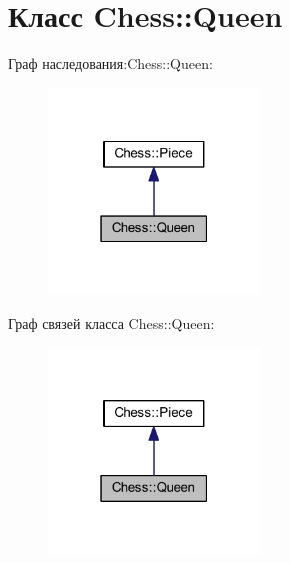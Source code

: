 \hypertarget{class_chess_1_1_queen}{}\section{Класс Chess\+:\+:Queen}
\label{class_chess_1_1_queen}


Граф наследования\+:Chess\+:\+:Queen\+:\nopagebreak
\begin{figure}[H]
\begin{center}
\leavevmode
\includegraphics[width=159pt]{class_chess_1_1_queen__inherit__graph}
\end{center}
\end{figure}


Граф связей класса Chess\+:\+:Queen\+:\nopagebreak
\begin{figure}[H]
\begin{center}
\leavevmode
\includegraphics[width=159pt]{class_chess_1_1_queen__coll__graph}
\end{center}
\end{figure}
